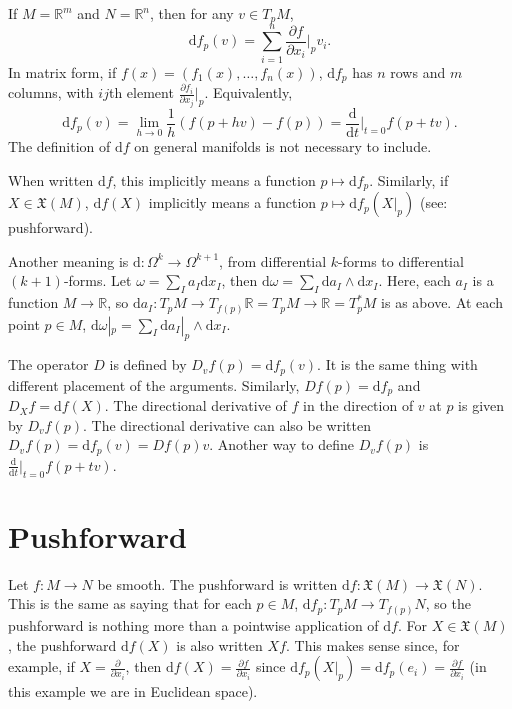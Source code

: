 \documentclass[10pt]{article}
\newcommand{\gap}{\vspace{3mm}}
\newcommand{\bb}[1]{\mathbb{#1}}
\newcommand{\de}{\mathrm{d}}
\newcommand{\frakx}{\mathfrak{X}}
\newcommand{\partials}[2]{\frac{\partial #1}{\partial #2}}
\begin{document}
	\gap
	If $M = \bb{R}^m$ and $N = \bb{R}^n$, then for any $v \in T_p M$,
	\[ \de f_p(v) = \sum_{i=1}^{n} \partials{f}{x_i} \bigg|_p v_i. \]
	In matrix form, if $f(x) = (f_1(x), \ldots, f_n(x))$, $\de f_p$ has $n$ rows and $m$ columns, with $ij$th element $\partials{f_i}{x_j} \big|_p$. Equivalently,
	\[ \de f_p(v) = \lim_{h \to 0} \frac{1}{h} (f(p + hv) - f(p)) = \frac{\de}{\de t} \big|_{t=0} f(p + tv). \]
	The definition of $\de f$ on general manifolds is not necessary to include.

	\gap
	When written $\de f$, this implicitly means a function $p \mapsto \de f_p$. Similarly, if $X \in \frakx(M)$, $\de f(X)$ implicitly means a function $p \mapsto \de f_p(X|_p)$ (see: pushforward).

	\gap
	Another meaning is $\de : \Omega^k \to \Omega^{k+1}$, from differential $k$-forms to differential $(k+1)$-forms. Let $\omega = \sum_I a_I \de x_I$, then $\de \omega = \sum_I \de a_I \wedge \de x_I$. Here, each $a_I$ is a function $M \to \bb{R}$, so $\de a_I : T_p M \to T_{f(p)} \bb{R} = T_p M \to \bb{R} = T_p^* M$ is as above. At each point $p \in M$, $\de \omega|_p = \sum_I \de a_I|_p \wedge \de x_I$.

	\gap
	The operator $D$ is defined by $D_v f(p) = \de f_p(v)$. It is the same thing with different placement of the arguments. Similarly, $Df(p) = \de f_p$ and $D_X f = \de f(X)$. The directional derivative of $f$ in the direction of $v$ at $p$ is given by $D_v f(p)$. The directional derivative can also be written $D_v f(p) = \de f_p(v) = Df(p)v$. Another way to define $D_v f(p)$ is $\frac{\de}{\de t} \big|_{t=0} f(p + tv)$.

	\section*{Pushforward}
	Let $f : M \to N$ be smooth. The pushforward is written $\de f : \frakx(M) \to \frakx(N)$. This is the same as saying that for each $p \in M$, $\de f_p : T_p M \to T_{f(p)} N$, so the pushforward is nothing more than a pointwise application of $\de f$. For $X \in \frakx(M)$, the pushforward $\de f(X)$ is also written $Xf$. This makes sense since, for example, if $X = \partials{}{x_i}$, then $\de f(X) = \partials{f}{x_i}$ since $\de f_p(X|_p) = \de f_p(e_i) = \partials{f}{x_i}$ (in this example we are in Euclidean space).
\end{document}
